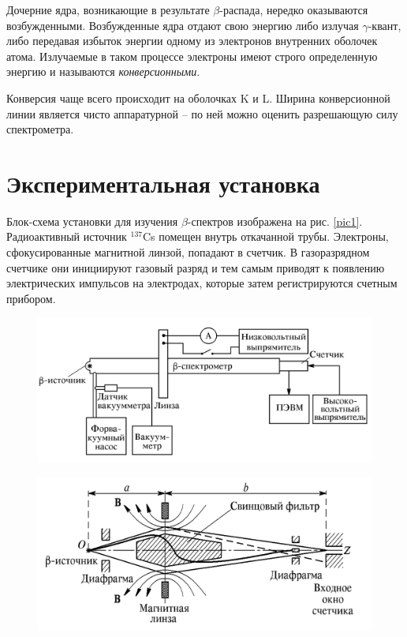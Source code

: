 \documentclass[a4paper, 12pt]{article}
\begin{document}
	Дочерние ядра, возникающие в результате $\beta$-распада, нередко оказываются возбужденными. Возбужденные ядра отдают свою энергию либо излучая $\gamma$-квант, либо передавая избыток энергии одному из электронов внутренних оболочек атома. Излучаемые в таком процессе электроны имеют строго определенную энергию и называются \textit{конверсионными}.
	
	Конверсия чаще всего происходит на оболочках K и L. Ширина конверсионной линии является чисто аппаратурной -- по ней можно оценить разрешающую силу спектрометра.
	
\section*{Экспериментальная установка}
	Блок-схема установки для изучения $\beta$-спектров изображена на рис. \ref{pic1}. Радиоактивный источник $^{137}$Cs помещен внутрь откачанной трубы. Электроны, сфокусированные магнитной линзой, попадают в счетчик. В газоразрядном счетчике они инициируют газовый разряд и тем самым приводят к появлению электрических импульсов на электродах, которые затем регистрируются счетным прибором.
    
    \begin{figure}[h]
    \centering
    \begin{minipage}{.5\textwidth}
      \centering
      \includegraphics[width=\linewidth]{scheme.png}
      \label{fig:test1}
    \end{minipage}%
    \begin{minipage}{.5\textwidth}
      \centering
      \includegraphics[width=\linewidth]{equip.png}
      \label{fig:test2}
    \end{minipage}
    \end{figure}
	
\end{document}
